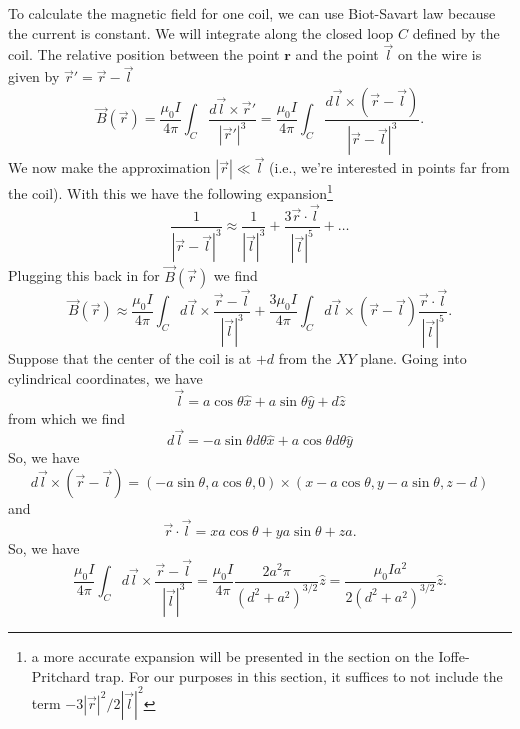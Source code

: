 \documentclass{article}
\theoremstyle{definition}
\newcommand{\f}[2]{\frac{#1}{#2}}
\begin{document}
To calculate the magnetic field for one coil, we can use Biot-Savart law because the current is constant. We will integrate along the closed loop $C$ defined by the coil. The relative position between the point $\mathbf{r}$ and the point $\vec{l}$ on the wire is given by $\vec{r}' = \vec{r} - \vec{l}$
\begin{equation*}
\vec{B}(\vec{r}) = \f{\mu_0 I}{4\pi} \int_C \f{d\vec{l} \times \vec{r}'}{ |{\vec{r}'}|^3} = \f{\mu_0 I}{4\pi} \int_C \f{d\vec{l} \times (\vec{r} - \vec{l})}{|{\vec{r} - \vec{l}}|^3}.  
\end{equation*}
We now make the approximation $|\vec{r}| \ll \vec{l}$ (i.e., we're interested in points far from the coil). With this we have the following expansion\footnote{a more accurate expansion will be presented in the section on the Ioffe-Pritchard trap. For our purposes in this section, it suffices to not include the term $-3|\vec{r}|^2/2|\vec{l}|^2$}
\begin{equation*}
\f{1}{|\vec{r} - \vec{l}|^3} \approx \f{1}{|\vec{l}|^3} + \f{3 \vec{r}\cdot \vec{l}}{|\vec{l}|^5} + \dots
\end{equation*}
Plugging this back in for $\vec{B}(\vec{r})$ we find 
\begin{equation*}
\vec{B}(\vec{r}) \approx \f{\mu_0 I}{4\pi}\int_C d\vec{l}\times \f{\vec{r} - \vec{l}}{|\vec{l}|^3} + \f{3\mu_0 I}{4\pi} \int_C d\vec{l} \times (\vec{r} - \vec{l}) \f{\vec{r}\cdot \vec{l}}{|\vec{l}|^5}.
\end{equation*}
Suppose that the center of the coil is at $+d$ from the $XY$ plane. Going into cylindrical coordinates, we have
\begin{equation*}
\vec{l} = a\cos\theta\hat{x} + a\sin\theta\hat{y} + d\hat{z}
\end{equation*}
from which we find 
\begin{equation*}
d\vec{l} = -a\sin\theta d\theta\hat{x} + a\cos\theta d\theta \hat{y}
\end{equation*}
So, we have
\begin{equation*}
d\vec{l} \times (\vec{r} - \vec{l}) = (-a\sin\theta, a\cos\theta,0)\times(x-a\cos\theta,y-a\sin\theta,z-d)
\end{equation*}
and 
\begin{equation*}
\vec{r}\cdot \vec{l} = xa\cos\theta + ya\sin\theta + za.
\end{equation*}
So, we have
\begin{equation*}
\f{\mu_0 I}{4\pi}\int_C d\vec{l}\times \f{\vec{r} - \vec{l}}{|\vec{l}|^3} = \f{\mu_0 I }{4\pi} \f{2a^2 \pi}{(d^2 + a^2)^{3/2}} \hat{z} = \f{\mu_0 I a^2}{2(d^2 + a^2)^{3/2}} \hat{z}.
\end{equation*}
\end{document}
